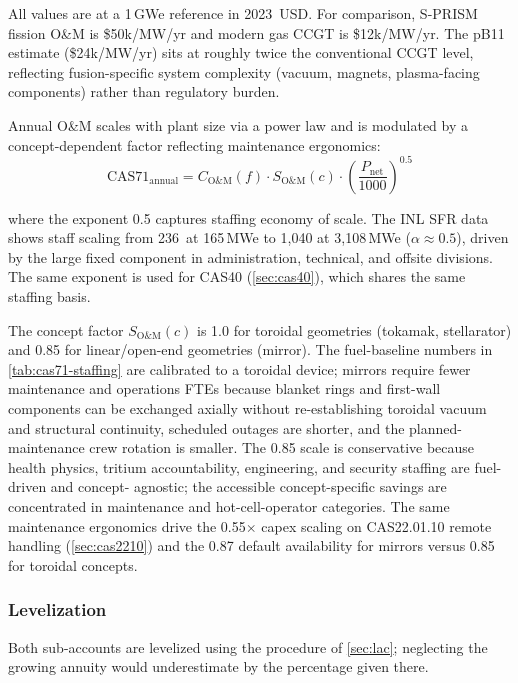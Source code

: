 \documentclass{article}
\begin{document}
\noindent All values are at a 1\,GWe reference in 2023~USD. For
comparison, S-PRISM fission O\&M is \$50k/MW/yr and modern gas CCGT
is \$12k/MW/yr. The pB11 estimate (\$24k/MW/yr) sits at roughly
twice the conventional CCGT level, reflecting fusion-specific system
complexity (vacuum, magnets, plasma-facing components) rather than
regulatory burden.

Annual O\&M scales with plant size via a power law and is modulated by
a concept-dependent factor reflecting maintenance ergonomics:
\begin{equation}
\label{eq:cas71}
\text{CAS71}_{\text{annual}} = C_{\text{O\&M}}(f) \cdot
               S_{\text{O\&M}}(c) \cdot
               \left(\frac{P_{\text{net}}}{1000}\right)^{0.5}
\end{equation}

\noindent where the exponent 0.5 captures staffing economy of scale.
The INL SFR data \citep{prosser2024} shows staff scaling from
236~at 165\,MWe to 1{,}040 at 3{,}108\,MWe ($\alpha \approx 0.5$),
driven by the large fixed component in administration, technical, and
offsite divisions. The same exponent is used for CAS40
(\cref{sec:cas40}), which shares the same staffing basis.

The concept factor $S_{\text{O\&M}}(c)$ is 1.0 for toroidal geometries
(tokamak, stellarator) and 0.85 for linear/open-end geometries
(mirror). The fuel-baseline numbers in \cref{tab:cas71-staffing} are
calibrated to a toroidal device; mirrors require fewer maintenance
and operations FTEs because blanket rings and first-wall components
can be exchanged axially without re-establishing toroidal vacuum and
structural continuity, scheduled outages are shorter, and the
planned-maintenance crew rotation is smaller. The 0.85 scale is
conservative because health physics, tritium accountability,
engineering, and security staffing are fuel-driven and concept-
agnostic; the accessible concept-specific savings are concentrated in
maintenance and hot-cell-operator categories. The same maintenance
ergonomics drive the 0.55$\times$ capex scaling on CAS22.01.10
remote handling (\cref{sec:cas2210}) and the 0.87 default
availability for mirrors versus 0.85 for toroidal concepts.

\subsubsection{Levelization}
Both sub-accounts are levelized using the procedure of \cref{sec:lac};
neglecting the growing annuity would underestimate by the percentage
given there.
\end{document}
